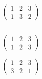 \begin{frame}
\begin{columns}
\begin{column}{0.33\textwidth}
\begin{equation*}
            \end{equation*}
            \par\vspace{0.3cm}
            \begin{equation*}
                \left(\begin{array}{ccc}
                    1 & 2 & 3 \\
                    1 & 3 & 2 
                \end{array}\right)
            \end{equation*}
        \end{column}
    \end{columns}
\end{frame}

\begin{frame}
    \begin{columns}
        \begin{column}{0.33\textwidth}
            \begin{equation*}
                \left(\begin{array}{ccc}
                    1 & 2 & 3 \\
                    1 & 2 & 3
                \end{array}\right)
            \end{equation*}
            \vspace{-0.5cm}
            \begin{figure}[H]
                \begin{centering}
                    
                \end{centering}
            \end{figure}
            \vspace{-0.2cm}
            \begin{equation*}
                \left(\begin{array}{ccc}
                    1 & 2 & 3 \\
                    3 & 2 & 1
                \end{array}\right)
            \end{equation*}
            \vspace{-0.5cm}
            \begin{figure}[H]
                \begin{centering}
                    
                \end{centering}
            \end{figure}

\end{column}
\end{columns}
\end{frame}
